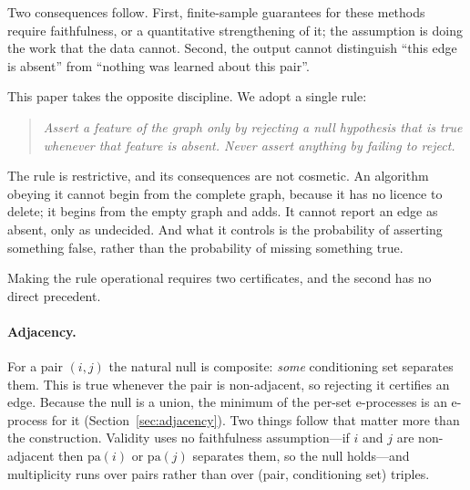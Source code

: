 \documentclass[11pt,a4paper]{article}
\theoremstyle{definition}
\theoremstyle{remark}
\newcommand{\pa}{\mathrm{pa}}
\begin{document}
Two consequences follow. First, finite-sample guarantees for these methods
require faithfulness, or a quantitative strengthening of it; the assumption is
doing the work that the data cannot. Second, the output cannot distinguish
``this edge is absent'' from ``nothing was learned about this pair''.

This paper takes the opposite discipline. We adopt a single rule:

\begin{quote}
\emph{Assert a feature of the graph only by rejecting a null hypothesis that is
true whenever that feature is absent. Never assert anything by failing to
reject.}
\end{quote}

The rule is restrictive, and its consequences are not cosmetic. An algorithm
obeying it cannot begin from the complete graph, because it has no licence to
delete; it begins from the empty graph and adds. It cannot report an edge as
absent, only as undecided. And what it controls is the probability of asserting
something false, rather than the probability of missing something true.

Making the rule operational requires two certificates, and the second has no
direct precedent.

\paragraph{Adjacency.} For a pair $(i,j)$ the natural null is composite:
\emph{some} conditioning set separates them. This is true whenever the pair is
non-adjacent, so rejecting it certifies an edge. Because the null is a union,
the minimum of the per-set e-processes is an e-process for it
(Section~\ref{sec:adjacency}). Two things follow that matter more than the
construction. Validity uses no faithfulness assumption---if $i$ and $j$ are
non-adjacent then $\pa(i)$ or $\pa(j)$ separates them, so the null holds---and
multiplicity runs over pairs rather than over (pair, conditioning set) triples.
\end{document}
